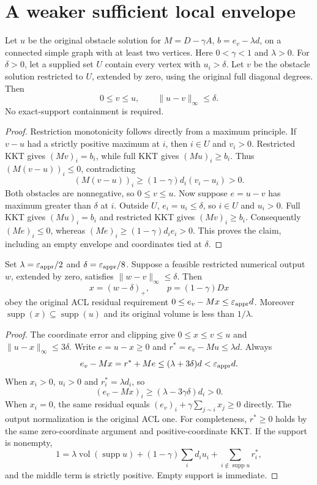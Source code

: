\section[A significant-potential envelope]{A weaker sufficient local envelope}
\label{sec:op3-significant-envelope}

\begin{theorem}
\label{thm:op3-significant-envelope}
Let $u$ be the original obstacle solution for
$M=D-\gamma A$, $b=e_v-\lambda d$, on a connected simple graph
with at least two vertices. Here $0<\gamma<1$ and $\lambda>0$.
For $\delta>0$, let a supplied set $U$ contain every vertex with
$u_i>\delta$. Let $v$ be the obstacle solution restricted to $U$,
extended by zero, using the original full diagonal degrees. Then
\[
 0\leq v\leq u,\qquad \|u-v\|_\infty\leq\delta.
\]
No exact-support containment is required.
\end{theorem}
\begin{proof}
Restriction monotonicity follows directly from a maximum principle.
If $v-u$ had a strictly positive maximum at $i$, then $i\in U$ and
$v_i>0$. Restricted KKT gives $(Mv)_i=b_i$, while full KKT gives
$(Mu)_i\geq b_i$. Thus $(M(v-u))_i\leq0$, contradicting
\[
 (M(v-u))_i\geq(1-\gamma)d_i(v_i-u_i)>0.
\]
Both obstacles are nonnegative, so $0\leq v\leq u$.
Now suppose $e=u-v$ has maximum greater than $\delta$ at $i$.
Outside $U$, $e_i=u_i\leq\delta$, so $i\in U$ and $u_i>0$.
Full KKT gives $(Mu)_i=b_i$ and restricted KKT gives
$(Mv)_i\geq b_i$. Consequently $(Me)_i\leq0$, whereas
$(Me)_i\geq(1-\gamma)d_i e_i>0$. This proves the claim,
including an empty envelope and coordinates tied at $\delta$.
\end{proof}

\begin{corollary}
\label{cor:op3-significant-envelope-ACL}
Set $\lambda=\varepsilon_{\mathrm{appr}}/2$ and $\delta=\varepsilon_{\mathrm{appr}}/8$.
Suppose a feasible restricted numerical output $w$, extended by zero,
satisfies $\|w-v\|_\infty\leq\delta$. Then
\[
 x=(w-\delta)_+,\qquad p=(1-\gamma)Dx
\]
obey the original ACL residual requirement
$0\leq e_v-Mx\leq\varepsilon_{\mathrm{appr}} d$. Moreover
$\operatorname{supp}(x)\subseteq\operatorname{supp}(u)$ and its
original volume is less than $1/\lambda$.
\end{corollary}
\begin{proof}
The coordinate error and clipping give $0\leq x\leq v\leq u$ and
$\|u-x\|_\infty\leq3\delta$. Write $e=u-x\geq0$ and
$r^*=e_v-Mu\leq\lambda d$. Always
\[
 e_v-Mx=r^*+Me\leq(\lambda+3\delta)d<\varepsilon_{\mathrm{appr}} d.
\]
When $x_i>0$, $u_i>0$ and $r_i^*=\lambda d_i$, so
\[
 (e_v-Mx)_i\geq(\lambda-3\gamma\delta)d_i>0.
\]
When $x_i=0$, the same residual equals
$(e_v)_i+\gamma\sum_{j\sim i}x_j\geq0$ directly.
The output normalization is the original ACL one.
For completeness, $r^*\geq0$ holds by the same zero-coordinate
argument and positive-coordinate KKT. If the support is nonempty,
\[
 1=\lambda\operatorname{vol}(\operatorname{supp}u)
 +(1-\gamma)\sum_i d_i u_i
 +\sum_{i\notin\operatorname{supp}u}r_i^*,
\]
and the middle term is strictly positive. Empty support is immediate.
\end{proof}


